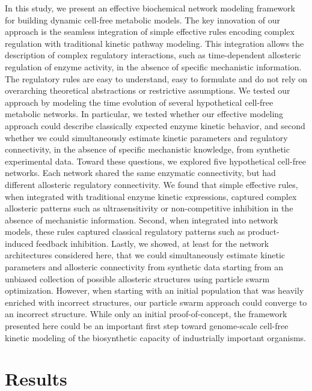 \documentclass[processes,article,accept,moreauthors,pdftex,12pt,a4paper]{mdpi}
\begin{document}
In this study, we present an effective biochemical network modeling framework for building dynamic cell-free metabolic models.
The key innovation of our approach is the seamless integration of simple effective rules encoding complex regulation with traditional kinetic pathway modeling. 
This integration allows the description of complex regulatory interactions, such as time-dependent allosteric regulation of enzyme activity, in the absence of specific mechanistic information. 
The regulatory rules are easy to understand, easy to formulate and do not rely on overarching theoretical abstractions or restrictive assumptions. 
We tested our approach by modeling the time evolution of several hypothetical cell-free metabolic networks. 
In particular, we tested whether our effective modeling approach could describe classically expected enzyme kinetic behavior, and second whether we could simultaneously estimate kinetic parameters and regulatory connectivity, in the absence of specific mechanistic knowledge, from synthetic experimental data. 
Toward these questions, we explored five hypothetical cell-free networks. 
Each network shared the same enzymatic connectivity, but had different allosteric regulatory connectivity. 
We found that simple effective rules, when integrated with traditional enzyme kinetic expressions, captured complex allosteric patterns such as ultrasensitivity or non-competitive inhibition in the absence of mechanistic information. Second, when integrated into network models, these rules captured classical regulatory patterns such as product-induced feedback inhibition. 
Lastly, we showed, at least for the network architectures considered here, that we could simultaneously estimate kinetic parameters and allosteric connectivity from synthetic data 
starting from an unbiased collection of possible allosteric structures using particle swarm optimization. However, when starting with an initial population that was heavily enriched with incorrect structures, our particle swarm approach could converge to an incorrect structure.
While only an initial proof-of-concept, the framework presented here could be an important first step toward genome-scale cell-free kinetic modeling of the biosynthetic capacity of industrially important organisms.

\newpage

\section{Results}\vspace{-12pt}
\end{document}
